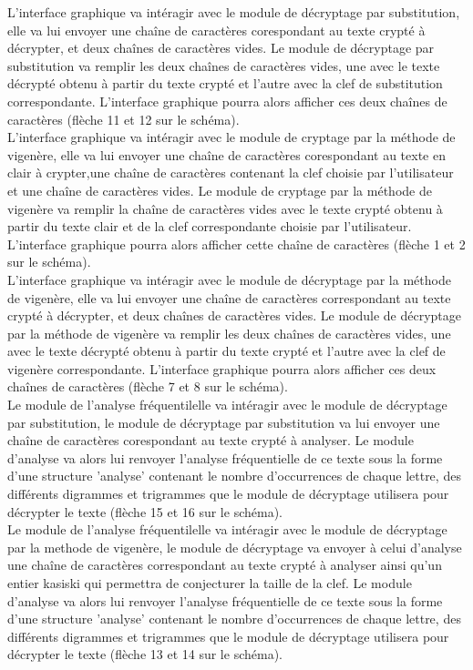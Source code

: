 \documentclass[a4]{article}
\begin{document}
	L'interface graphique va intéragir avec le module de décryptage par substitution, elle va lui envoyer une 
	chaîne de caractères corespondant au texte crypté à décrypter, et deux chaînes de caractères vides. Le module 
	de décryptage par substitution va remplir les deux chaînes de caractères vides, une avec le texte décrypté obtenu
	à partir du texte crypté et l'autre avec la clef de substitution correspondante. L'interface graphique pourra 
	alors afficher ces deux chaînes de caractères (flèche 11 et 12 sur le schéma). \\

	L'interface graphique va intéragir avec le module de cryptage par la méthode de vigenère, elle va lui envoyer une
	chaîne de caractères corespondant au texte en clair à crypter,une chaîne de caractères contenant la clef choisie par 
	l'utilisateur et une chaîne de caractères vides. Le module de cryptage par la méthode de vigenère va remplir la chaîne
	de caractères vides avec le texte crypté obtenu à partir du texte clair et de la clef correspondante choisie par
	l'utilisateur. L'interface graphique pourra alors afficher cette chaîne de caractères (flèche 1 et 2 sur le schéma). \\

	L'interface graphique va intéragir avec le module de décryptage par la méthode de vigenère, elle va lui envoyer une 
	chaîne de caractères correspondant au texte crypté à décrypter, et deux chaînes de caractères vides. Le module de 
	décryptage par la méthode de vigenère va remplir les deux chaînes de caractères vides, une avec le texte décrypté 
	obtenu à partir du texte crypté et l'autre avec la clef de vigenère correspondante. L'interface graphique pourra 
	alors afficher ces deux chaînes de caractères (flèche 7 et 8 sur le schéma). \\

	Le module de l'analyse fréquentilelle va intéragir avec le module de décryptage par substitution,
	le module de décryptage par substitution va lui envoyer une chaîne de caractères corespondant au texte 
	crypté à analyser. Le module d'analyse va alors lui renvoyer l'analyse fréquentielle de ce texte sous 
	la forme d'une structure 'analyse' contenant le nombre d'occurrences de chaque lettre, des différents digrammes 
	et trigrammes que le module de décryptage utilisera pour décrypter le texte (flèche 15 et 16 sur le schéma). \\

	Le module de l'analyse fréquentilelle va intéragir avec le module de décryptage par la methode de vigenère, 
	le module de décryptage va envoyer à celui d'analyse une chaîne de caractères correspondant au texte crypté à
	analyser ainsi qu'un entier kasiski qui permettra de conjecturer la taille de la clef. Le module d'analyse va 
	alors lui renvoyer l'analyse fréquentielle de ce texte sous la forme d'une structure 'analyse' contenant le nombre
	d'occurrences de chaque lettre, des différents digrammes et trigrammes que le module de décryptage utilisera pour 
	décrypter le texte (flèche 13 et 14 sur le schéma). \\
\end{document}

